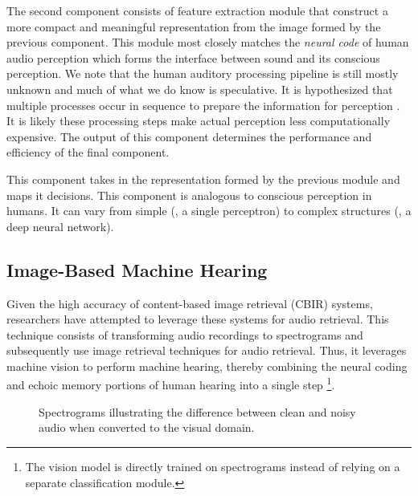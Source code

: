 The second component consists of feature extraction module that construct a more
compact and meaningful representation from the image formed by the previous
component.
This module most closely matches the \textit{neural code} of human audio
perception which forms the interface between sound and its conscious perception.
We note that the human auditory processing pipeline is still mostly unknown
and much of what we do know is speculative. 
It is hypothesized that multiple processes occur in
sequence to prepare the information for perception \cite{Eggermont2001}. 
It is likely these processing steps make actual perception less computationally
expensive. The output of this component determines the performance and
efficiency of the final component.

This component takes in the representation formed by the previous module 
and maps it decisions. This component is analogous to conscious perception in
humans. It can vary from simple (\eg, a single perceptron) to complex
structures (\eg, a deep neural network).

\subsection{Image-Based Machine Hearing}

Given the high accuracy of content-based image retrieval (CBIR) systems, 
researchers have attempted to leverage these systems for audio retrieval.
This technique consists of transforming audio recordings to spectrograms and
subsequently use image retrieval techniques for audio retrieval.
Thus, it leverages machine vision to perform machine hearing, thereby 
combining the neural coding and echoic memory portions of human hearing 
into a single step \footnote{The vision model is directly trained on
spectrograms instead of relying on a separate classification module.}.

\begin{figure}[!tbp]
    \centering
    \hfill
    \caption{Spectrograms illustrating the difference between clean and noisy audio when converted to the visual domain.}
    \label{fig:noisy-audio-cmpr}
\end{figure}

